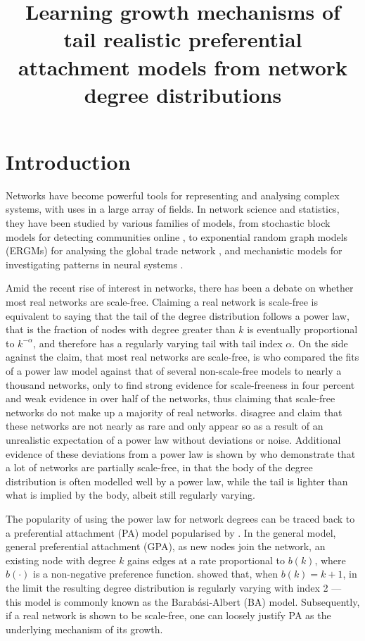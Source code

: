 \documentclass[
  sn-basic,
  10pt,
]{sn-jnl}
\title[Learning growth mechanisms of tail realistic preferential
attachment models from network degree distributions]{Learning growth
mechanisms of tail realistic preferential attachment models from network
degree distributions}
\author*[1]{\fnm{Thomas William} \sur{Boughen}}\email{t.w.boughen1@newcastle.ac.uk}\author[1]{\fnm{Clement} \sur{Lee}}\author[1]{\fnm{Vianey Palacios} \sur{Ramírez}}
\affil[1]{\orgdiv{School of Mathematics, Statistics and
Physics}, \orgname{Newcastle University}}
\theoremstyle{thmstyleone}
\theoremstyle{thmstyleone}
\theoremstyle{remark}
\theoremstyle{plain}
\theoremstyle{plain}
\theoremstyle{remark}
\begin{document}
\maketitle


\newpage

\section{Introduction}\label{introduction}

Networks have become powerful tools for representing and analysing
complex systems, with uses in a large array of fields. In network
science and statistics, they have been studied by various families of
models, from stochastic block models for detecting communities online
\citep{Latouche11}, to exponential random graph models (ERGMs) for
analysing the global trade network \citep{Setayesh22}, and mechanistic
models for investigating patterns in neural systems \citep{Betzel17}.

Amid the recent rise of interest in networks, there has been a debate on
whether most real networks are scale-free. Claiming a real network is
scale-free is equivalent to saying that the tail of the degree
distribution follows a power law, that is the fraction of nodes with
degree greater than \(k\) is eventually proportional to \(k^{-\alpha}\),
and therefore has a regularly varying tail with tail index \(\alpha\).
On the side against the claim, that most real networks are scale-free,
is \citet{Broido_2019} who compared the fits of a power law model
against that of several non-scale-free models to nearly a thousand
networks, only to find strong evidence for scale-freeness in four
percent and weak evidence in over half of the networks, thus claiming
that scale-free networks do not make up a majority of real networks.
\citet{Voitalov_2019} disagree and claim that these networks are not
nearly as rare and only appear so as a result of an unrealistic
expectation of a power law without deviations or noise. Additional
evidence of these deviations from a power law is shown by \citet{Lee24}
who demonstrate that a lot of networks are partially scale-free, in that
the body of the degree distribution is often modelled well by a power
law, while the tail is lighter than what is implied by the body, albeit
still regularly varying.

The popularity of using the power law for network degrees can be traced back to a preferential attachment (PA) model popularised by \cite{Barabasi99}. In the general model, general preferential attachment (GPA), as new nodes join the network, an existing node with degree $k$ gains edges at a rate proportional to $b(k)$, where $b(\cdot)$ is a non-negative preference function. \cite{Barabasi99} showed that, when $b(k) = k + 1$, in the limit the resulting degree distribution is regularly varying with index 2 — this model is commonly known as the Barab\'asi-Albert (BA) model.  Subsequently, if a real network is shown to be scale-free, one can loosely justify PA as the underlying mechanism of its growth.
\end{document}
